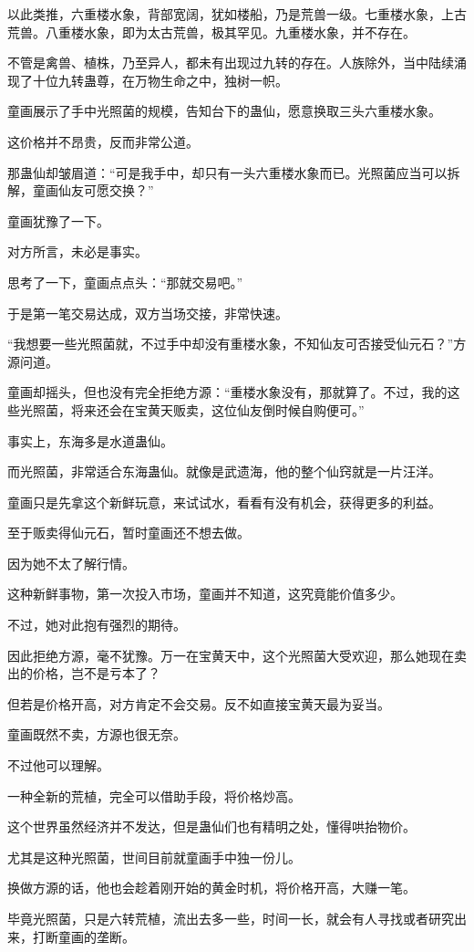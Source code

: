 \begin{this_body}
以此类推，六重楼水象，背部宽阔，犹如楼船，乃是荒兽一级。七重楼水象，上古荒兽。八重楼水象，即为太古荒兽，极其罕见。九重楼水象，并不存在。

不管是禽兽、植株，乃至异人，都未有出现过九转的存在。人族除外，当中陆续涌现了十位九转蛊尊，在万物生命之中，独树一帜。

童画展示了手中光照菌的规模，告知台下的蛊仙，愿意换取三头六重楼水象。

这价格并不昂贵，反而非常公道。

那蛊仙却皱眉道：“可是我手中，却只有一头六重楼水象而已。光照菌应当可以拆解，童画仙友可愿交换？”

童画犹豫了一下。

对方所言，未必是事实。

思考了一下，童画点点头：“那就交易吧。”

于是第一笔交易达成，双方当场交接，非常快速。

“我想要一些光照菌就，不过手中却没有重楼水象，不知仙友可否接受仙元石？”方源问道。

童画却摇头，但也没有完全拒绝方源：“重楼水象没有，那就算了。不过，我的这些光照菌，将来还会在宝黄天贩卖，这位仙友倒时候自购便可。”

事实上，东海多是水道蛊仙。

而光照菌，非常适合东海蛊仙。就像是武遗海，他的整个仙窍就是一片汪洋。

童画只是先拿这个新鲜玩意，来试试水，看看有没有机会，获得更多的利益。

至于贩卖得仙元石，暂时童画还不想去做。

因为她不太了解行情。

这种新鲜事物，第一次投入市场，童画并不知道，这究竟能价值多少。

不过，她对此抱有强烈的期待。

因此拒绝方源，毫不犹豫。万一在宝黄天中，这个光照菌大受欢迎，那么她现在卖出的价格，岂不是亏本了？

但若是价格开高，对方肯定不会交易。反不如直接宝黄天最为妥当。

童画既然不卖，方源也很无奈。

不过他可以理解。

一种全新的荒植，完全可以借助手段，将价格炒高。

这个世界虽然经济并不发达，但是蛊仙们也有精明之处，懂得哄抬物价。

尤其是这种光照菌，世间目前就童画手中独一份儿。

换做方源的话，他也会趁着刚开始的黄金时机，将价格开高，大赚一笔。

毕竟光照菌，只是六转荒植，流出去多一些，时间一长，就会有人寻找或者研究出来，打断童画的垄断。


\end{this_body}
